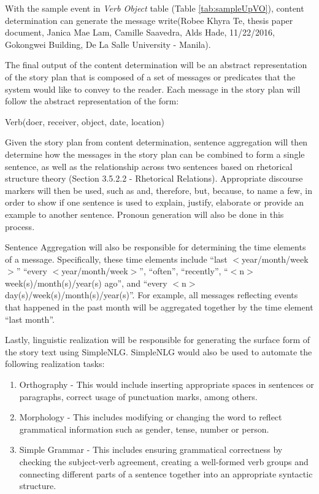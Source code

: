 With the sample event in \textit{Verb Object} table (Table \ref{tab:sampleUpVO}), content determination can generate the message write(Robee Khyra Te, thesis paper document, Janica Mae Lam, Camille Saavedra, Alds Hade, 11/22/2016, Gokongwei Building, De La Salle University - Manila). 

The final output of the content determination will be an abstract representation of the story plan that is composed of a set of messages or predicates that the system would like to convey to the reader. Each message in the story plan will follow the abstract representation of the form:
\begin{center}Verb(doer, receiver, object, date, location) \end{center}

Given the story plan from content determination, sentence aggregation will then determine how the messages in the story plan can be combined to form a single sentence, as well as the relationship across two sentences based on rhetorical structure theory (Section 3.5.2.2 - Rhetorical Relations). Appropriate discourse markers will then be used, such as and, therefore, but, because, to name a few, in order to show if one sentence is used to explain, justify, elaborate or provide an example to another sentence. Pronoun generation will also be done in this process. 

Sentence Aggregation will also be responsible for determining the time elements of a message. Specifically, these time elements include ``last $<$year/month/week$>$'' ``every $<$year/month/week$>$'', ``often'', ``recently'', ``$<$n$>$ week(s)/month(s)/year(s) ago'', and ``every $<$n$>$ day(s)/week(s)/month(s)/year(s)''. For example, all messages reflecting events that happened in the past month will be aggregated together by the time element ``last month''.

Lastly, linguistic realization will be responsible for generating the surface form of the story text using SimpleNLG. SimpleNLG would also be used to automate the following realization tasks:
\begin{enumerate} [label=\alph*.]
\item Orthography - This would include inserting appropriate spaces in sentences or paragraphs, correct usage of punctuation marks, among others.
\item Morphology - This includes modifying or changing the word to reflect grammatical information such as gender, tense, number or person.
\item Simple Grammar - This includes ensuring grammatical correctness by checking the subject-verb agreement, creating a well-formed verb groups and connecting different parts of a sentence together into an appropriate syntactic structure.
\end{enumerate}

